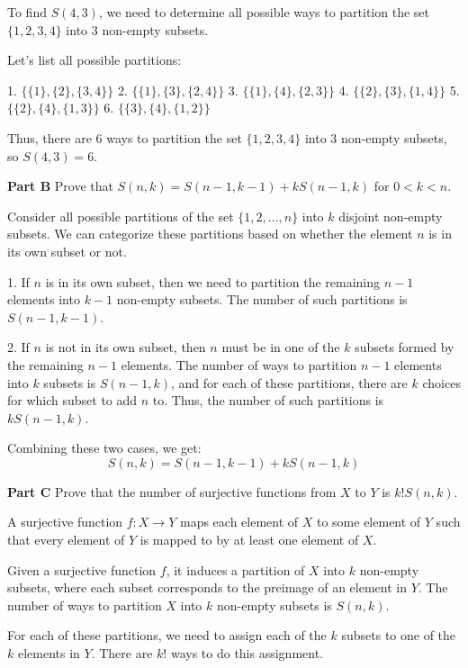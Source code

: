 \documentclass{article}
\begin{document}
	To find \( S(4, 3) \), we need to determine all possible ways to partition the set \(\{1, 2, 3, 4\}\) into 3 non-empty subsets. 
	
	Let's list all possible partitions:
	
	1. \(\{\{1\}, \{2\}, \{3, 4\}\}\)
	2. \(\{\{1\}, \{3\}, \{2, 4\}\}\)
	3. \(\{\{1\}, \{4\}, \{2, 3\}\}\)
	4. \(\{\{2\}, \{3\}, \{1, 4\}\}\)
	5. \(\{\{2\}, \{4\}, \{1, 3\}\}\)
	6. \(\{\{3\}, \{4\}, \{1, 2\}\}\)
	
	Thus, there are 6 ways to partition the set \(\{1, 2, 3, 4\}\) into 3 non-empty subsets, so \( S(4, 3) = 6 \).
	
	\textbf{Part B}
	Prove that \( S(n, k) = S(n-1, k-1) + kS(n-1, k) \) for \( 0 < k < n \).
	
	Consider all possible partitions of the set \(\{1, 2, ..., n\}\) into \( k \) disjoint non-empty subsets. We can categorize these partitions based on whether the element \( n \) is in its own subset or not.
	
	1. If \( n \) is in its own subset, then we need to partition the remaining \( n-1 \) elements into \( k-1 \) non-empty subsets. The number of such partitions is \( S(n-1, k-1) \).
	
	2. If \( n \) is not in its own subset, then \( n \) must be in one of the \( k \) subsets formed by the remaining \( n-1 \) elements. The number of ways to partition \( n-1 \) elements into \( k \) subsets is \( S(n-1, k) \), and for each of these partitions, there are \( k \) choices for which subset to add \( n \) to. Thus, the number of such partitions is \( kS(n-1, k) \).
	
	Combining these two cases, we get:
	\[ S(n, k) = S(n-1, k-1) + kS(n-1, k) \]
	
	\textbf{Part C}
	Prove that the number of surjective functions from \( X \) to \( Y \) is \( k! S(n, k) \).
	
	A surjective function \( f: X \to Y \) maps each element of \( X \) to some element of \( Y \) such that every element of \( Y \) is mapped to by at least one element of \( X \). 
	
	Given a surjective function \( f \), it induces a partition of \( X \) into \( k \) non-empty subsets, where each subset corresponds to the preimage of an element in \( Y \). The number of ways to partition \( X \) into \( k \) non-empty subsets is \( S(n, k) \).
	
	For each of these partitions, we need to assign each of the \( k \) subsets to one of the \( k \) elements in \( Y \). There are \( k! \) ways to do this assignment.
	
\end{document}
